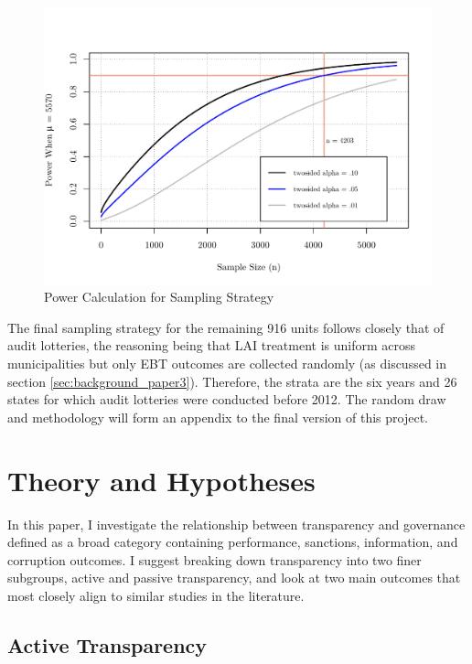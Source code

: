 \documentclass[11pt]{article}
\begin{document}
\begin{figure}
\centering
\caption{Power Calculation for Sampling Strategy}
\label{fig:power}
\includegraphics[trim = {0 .5cm 0 2cm}, clip, scale = .75]{power.pdf}
\end{figure}

The final sampling strategy for the remaining 916 units follows closely that of audit lotteries, the reasoning being that LAI treatment is uniform across municipalities but only EBT outcomes are collected randomly (as discussed in section \ref{sec:background_paper3}). Therefore, the strata are the six years and 26 states for which audit lotteries were conducted before 2012. The random draw and methodology will form an appendix to the final version of this project.

\section{Theory and Hypotheses} \label{sec:theory_paper3}

In this paper, I investigate the relationship between transparency and governance defined as a broad category containing performance, sanctions, information, and corruption outcomes. I suggest breaking down transparency into two finer subgroups, active and passive transparency, and look at two main outcomes that most closely align to similar studies in the literature.

\subsection{Active Transparency} \label{subsec:theory1_paper3}
\end{document}
